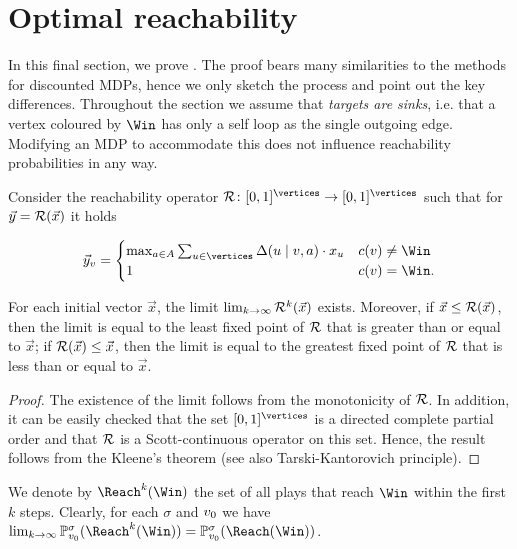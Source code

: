 \section{Optimal reachability}
\label{5-sec:general-reachability}

In this final section, we prove . The proof bears many similarities to the methods for discounted MDPs, hence we only sketch the process and point out the key differences. Throughout the section we assume that \emph{targets are sinks}, i.e. that a vertex coloured by $\Win$ has only a self loop as the single outgoing edge. Modifying an MDP to accommodate this does not influence reachability probabilities in any way.

Consider the reachability operator $\ReachOp\colon[0,1]^{\vertices}\rightarrow [0,1]^{\vertices}$ such that for $\vec{y} = \mathcal{R}(\vec{x})$ it holds

\[
\vec{y}_v = \begin{cases}

 \max_{a\in \actions} \sum_{u\in \vertices} \probTranFunc(u \mid v,a)\cdot x_u & \colouring(v) \neq \Win \\
 1 & \colouring(v) = \Win.
\end{cases} 
\]

\begin{lemma}
\label{5-lem:quant-reach-operator-fixed-point}
For each initial vector $\vec{x}$, the limit $\lim_{k \rightarrow \infty}\mathcal{R}^k(\vec{x})$ exists. Moreover, if $\vec{x} \leq \mathcal{R}(\vec{x})$, then the limit is equal to the least fixed point of $\mathcal{R}$ that is greater than or equal to $\vec{x}$; if $\mathcal{R}(\vec{x})\leq \vec{x}$, then the limit is equal to the greatest fixed point of $\mathcal{R}$ that is less than or equal to $\vec{x}$.
\end{lemma}
\begin{proof}
The existence of the limit follows from the monotonicity of $\mathcal{R}$.
In addition, it can be easily checked that the set $[0,1]^{\vertices}$ is a directed complete partial order and that $\mathcal{R}$ is a Scott-continuous operator on this set. Hence, the result follows from the Kleene's theorem (see also Tarski-Kantorovich principle).
\end{proof}

We denote by $\Reach^k(\Win)$ the set of all plays that reach $\Win$ within the first $k$ steps. Clearly, for each $\sigma$ and $v_0$ we have $\lim_{k \rightarrow \infty} \probm^\sigma_{\vinit}(\Reach^k(\Win)) = \probm^\sigma_{\vinit}(\Reach(\Win))$.

